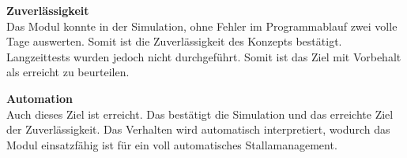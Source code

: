 \textbf{Zuverlässigkeit}\\
Das Modul konnte in der Simulation, ohne Fehler im Programmablauf zwei volle Tage auswerten. Somit ist die Zuverlässigkeit des Konzepts bestätigt. Langzeittests wurden jedoch nicht durchgeführt. Somit ist das Ziel mit Vorbehalt als erreicht zu beurteilen. 
\par

\textbf{Automation}\\
Auch dieses Ziel ist erreicht. Das bestätigt die Simulation und das erreichte Ziel der Zuverlässigkeit. Das Verhalten wird automatisch interpretiert, wodurch das Modul einsatzfähig ist für ein voll automatisches Stallamanagement. \par



